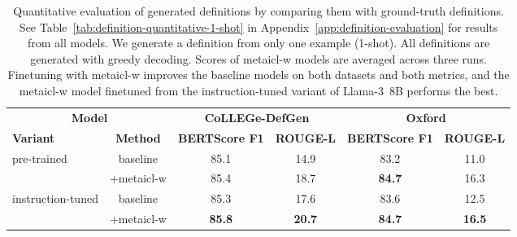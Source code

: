 \documentclass{article}
\begin{document}
\begin{table*}[t]
\small
\begin{center}
\begin{tabular}{p{1.2cm}c|cccc}
\toprule
\multicolumn{2}{c|}{\bf Model} & \multicolumn{2}{c}{\bf CoLLEGe-DefGen} & \multicolumn{2}{c}{\bf Oxford} \\
 \bf Variant & \bf Method & \bf BERTScore F1 & \bf ROUGE-L & \bf BERTScore F1 & \bf ROUGE-L \\
\midrule
\multirow{2}{=}{pre-trained}
           &             baseline          & 85.1 & 14.9 & 83.2 & 11.0 \\
           & +\ac{metaicl-w}               & 85.4 & 18.7 & \textbf{84.7} & 16.3 \\
\midrule
\multirow{2}{=}{instruction-tuned}
                   &     baseline          & 85.3 & 17.6 & 83.6 & 12.5 \\
                   &+\ac{metaicl-w}        & \textbf{85.8} & \textbf{20.7} & \textbf{84.7} & \textbf{16.5} \\
\bottomrule
\end{tabular}
\end{center}
\caption{Quantitative evaluation of generated definitions by comparing them with ground-truth definitions.
See Table~\ref{tab:definition-quantitative-1-shot} in Appendix~\ref{app:definition-evaluation} for results from all models.
We generate a definition from only one example (1-shot). All definitions are generated with greedy decoding.
Scores of \ac{metaicl-w} models are averaged across three runs.
Finetuning with \ac{metaicl-w} improves the baseline models on both datasets and both metrics, and the \ac{metaicl-w} model finetuned from the instruction-tuned variant of \mbox{Llama-3 8B} performs the best.
}
\label{tab:definition-quantitative-1-shot-brief}
\end{table*}
\end{document}
